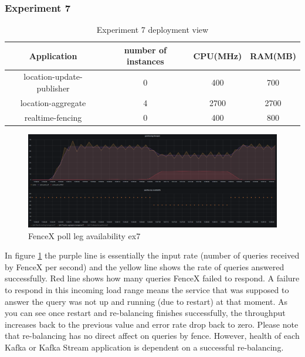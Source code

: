 \documentclass[a4]{report}
\begin{document}
    \clearpage

    \subsubsection{Experiment 7}

    \begin{table}[h!]
        \centering
        \begin{tabular}{|c|c|c|c|}
            \hline
            Application               & number of instances & CPU(MHz) & RAM(MB) \\
            \hline
            location-update-publisher & 0                   & 400      & 700     \\
            location-aggregate        & 4                   & 2700     & 2700    \\
            realtime-fencing          & 0                   & 400      & 800     \\
            \hline
        \end{tabular}
        \caption{Experiment 7 deployment view}
        \label{table:ex7-dv}
    \end{table}

    \begin{figure}[ht]
        \caption{FenceX poll leg availability ex7}
        \label{fig:ex7}
        \includegraphics[scale=0.4]{images/evaluation/ex7-benchmarking-ongoing-2per10sec.png}
    \end{figure}

    In figure \ref{fig:ex7} the purple line is essentially the input rate (number of queries received by FenceX per
    second) and the yellow line shows the rate of queries answered successfully.
    Red line shows how many queries FenceX failed to respond.
    A failure to respond in this incoming load range means the service that was supposed to answer the query was not
    up and running (due to restart) at that moment.
    As you can see once restart and re-balancing finishes successfully, the throughput increases back to the previous
    value and error rate drop back to zero.
    Please note that re-balancing has no direct affect on queries by fence.
    However, health of each Kafka or Kafka Stream application is dependent on a successful re-balancing.
\end{document}
